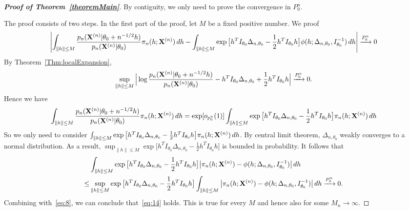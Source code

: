 \documentclass[3p]{elsarticle}
\theoremstyle{plain}
\theoremstyle{definition}
\theoremstyle{remark}
\begin{document}
\begin{proof}[\textbf{Proof of Theorem~\ref{theoremMain}}]
    By contiguity, we only need to prove the convergence in $P_0^n$.

The proof consists of two steps. In the first part of the proof, let  $M$ be a fixed positive number. We proof
\begin{equation}\label{eq:14}
    \left|\int_{\|h\|\leq M} \frac{p_n(\mathbf{X}^{(n)}|\theta_0+n^{-1/2}h)}{p_n(\mathbf{X}^{(n)}|\theta_0)}\pi_n (h;\mathbf{X}^{(n)}) \, dh-\int_{\|h\|\leq M} \exp\big[h^T I_{\theta_0}\Delta_{n,\theta_0}-\frac{1}{2}h^T I_{\theta_0}h\big] \phi(h;\Delta_{n,\theta_0},I_{\theta_0}^{-1})\, dh\right|
 \xrightarrow{P^n_0}0
\end{equation}
By Theorem~\ref{Thm:localExpansion},
\begin{equation*}
    \sup_{\|h\|\leq M}\Big|\log \frac{p_n(\mathbf{X}^{(n)}|\theta_0+n^{-1/2}h)}{p_n(\mathbf{X}^{(n)}|\theta_0)}-h^T I_{\theta_0}\Delta_{n,\theta_0}+\frac{1}{2}h^T I_{\theta_0}h \Big|\xrightarrow{P_0^n}0 .
\end{equation*}
Hence we have
\begin{equation}\label{eq:8}
    \int_{\|h\|\leq M} \frac{p_n(\mathbf{X}^{(n)}|\theta_0+n^{-1/2}h)}{p_n(\mathbf{X}^{(n)}|\theta_0)}\pi_n (h;\mathbf{X}^{(n)}) \, dh=
    \exp [o_{p^n_0}(1)]\int_{\|h\|\leq M} \exp\big[h^T I_{\theta_0}\Delta_{n,\theta_0}-\frac{1}{2}h^T I_{\theta_0}h\big]\pi_n (h;\mathbf{X}^{(n)}) \, dh
\end{equation}
    So we only need to consider $\int_{\|h\|\leq M} \exp\big[h^T I_{\theta_0}\Delta_{n,\theta_0}-\frac{1}{2}h^T I_{\theta_0}h\big]\pi_n (h;\mathbf{X}^{(n)}) \, dh$.
    By central limit theorem, $\Delta_{n,\theta_0}$ weakly converges to a normal distribution.
    As a result, $\sup_{\|h\|\leq M}\exp\big[h^T I_{\theta_0}\Delta_{n,\theta_0}-\frac{1}{2}h^T I_{\theta_0}h\big]$ is bounded in probability.
    It follows that
\begin{equation*}
\begin{aligned}
    &\int_{\|h\|\leq M} \exp\big[h^T I_{\theta_0}\Delta_{n,\theta_0}-\frac{1}{2}h^T I_{\theta_0}h\big] \big|\pi_n (h;\mathbf{X}^{(n)})-\phi(h;\Delta_{n,\theta_0},I_{\theta_0}^{-1})\big|\, dh
\\
    \leq& \sup_{\|h\|\leq M}\exp\big[h^T I_{\theta_0}\Delta_{n,\theta_0}-\frac{1}{2}h^T I_{\theta_0}h\big] 
    \int_{\|h\|\leq M}
    \big|\pi_n (h;\mathbf{X}^{(n)})-\phi(h;\Delta_{n,\theta_0},I_{\theta_0}^{-1})\big|\, dh
    \xrightarrow{P^n_0}0.
\end{aligned}
\end{equation*}
Combining with~\eqref{eq:8}, we can conclude that~\eqref{eq:14} holds. 
This is true for every $M$ and hence also for some $M_n\to \infty$.


\end{proof}
\end{document}
